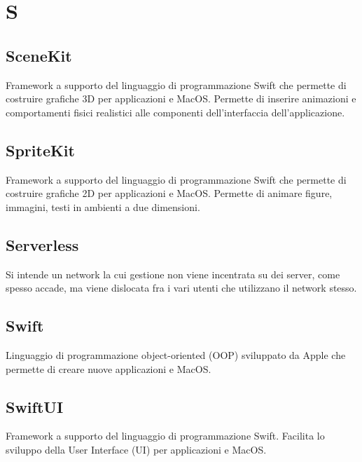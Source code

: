 \section*{S}
\markright{}
\subsection*{SceneKit}
Framework a supporto del linguaggio di programmazione Swift che permette di costruire grafiche 3D per applicazioni  e MacOS. Permette di inserire animazioni e comportamenti fisici realistici alle componenti dell'interfaccia dell'applicazione.  
\subsection*{SpriteKit}
Framework a supporto del linguaggio di programmazione Swift che permette di costruire grafiche 2D per applicazioni  e MacOS. Permette di animare figure, immagini, testi in ambienti a due dimensioni.
\subsection*{Serverless}
Si intende un network la cui gestione non viene incentrata su dei server, come spesso accade, ma viene dislocata fra i vari utenti che utilizzano il network stesso.
\subsection*{Swift}
Linguaggio di programmazione object-oriented (OOP) sviluppato da Apple che permette di creare nuove applicazioni  e MacOS.  
\subsection*{SwiftUI}
Framework a supporto del linguaggio di programmazione Swift. Facilita lo sviluppo della User Interface (UI) per applicazioni  e MacOS.